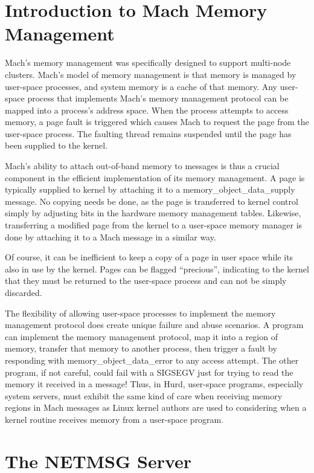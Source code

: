 \documentclass{article}
\begin{document}
\section{Introduction to Mach Memory Management}

Mach's memory management was specifically designed to support
multi-node clusters.  Mach's model of memory management is that memory
is managed by user-space processes, and system memory is a cache of
that memory.  Any user-space process that implements Mach's memory
management protocol can be mapped into a process's address space.
When the process attempts to access memory, a page fault is triggered
which causes Mach to request the page from the user-space process.
The faulting thread remains suspended until the page has been supplied
to the kernel.

Mach's ability to attach out-of-band memory to messages is thus a
crucial component in the efficient implementation of its memory
management.  A page is typically supplied to kernel by attaching it to
a memory_object_data_supply message.  No copying needs be done, as the
page is transferred to kernel control simply by adjusting bits in the
hardware memory management tables.  Likewise, transferring a modified
page from the kernel to a user-space memory manager is done by
attaching it to a Mach message in a similar way.

Of course, it can be inefficient to keep a copy of a page in user
space while its also in use by the kernel.  Pages can be flagged
``precious'', indicating to the kernel that they must be returned to
the user-space process and can not be simply discarded.

The flexibility of allowing user-space processes to implement the
memory management protocol does create unique failure and abuse
scenarios.  A program can implement the memory management protocol,
map it into a region of memory, transfer that memory to another
process, then trigger a fault by responding with
memory_object_data_error to any access attempt.  The other program, if
not careful, could fail with a SIGSEGV just for trying to read the
memory it received in a message!  Thus, in Hurd, user-space programs,
especially system servers, must exhibit the same kind of care when
receiving memory regions in Mach messages as Linux kernel authors are
used to considering when a kernel routine receives memory from a
user-space program.


\section{The NETMSG Server}
\end{document}
